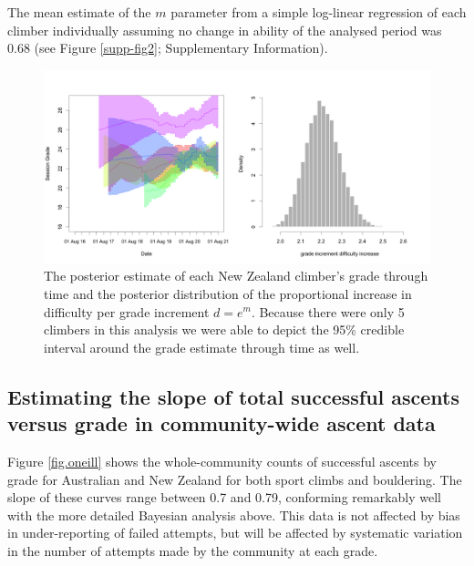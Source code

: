 \documentclass{article}
\newcommand{\Cnz}{5}
\newcommand{\meanregmnz}{0.68}
\begin{document}
The mean estimate of the $m$ parameter from a simple log-linear regression of each climber individually assuming no change in ability of the analysed period was \meanregmnz{} (see Figure \ref{supp-fig2}; Supplementary Information). 


\begin{figure}
\centering
\includegraphics[width=\textwidth]{../results/nz/ascents-from-2016-08-01-to-2021-08-01-minAscents400-minFails1-session-posterior.png}
\caption{\small The posterior estimate of each New Zealand climber's grade through time and the posterior distribution of the proportional increase in difficulty per grade increment $d = e^m$. Because there were only \Cnz{} climbers in this analysis we were able to depict the 95\% credible interval around the grade estimate through time as well.}
\label{nz_ascents}
\end{figure}


\subsection*{Estimating the slope of total successful ascents versus grade in community-wide ascent data}

Figure \ref{fig.oneill} shows the whole-community counts of successful ascents by grade for Australian and New Zealand for both sport climbs and bouldering. The slope of these curves range between 0.7 and 0.79, conforming remarkably well with the more detailed Bayesian analysis above. This data is not affected by bias in under-reporting of failed attempts, but will be affected by systematic variation in the number of attempts made by the community at each grade.
\end{document}

